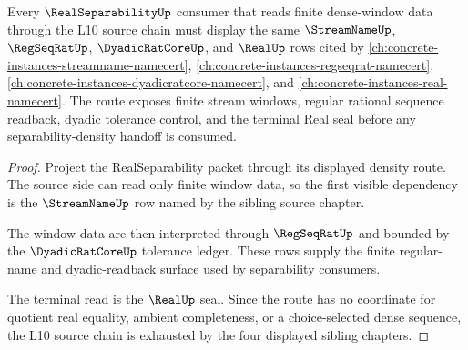 \begin{theorem}
\label{thm:real-separability-l10-source-route}
Every $\RealSeparabilityUp$ consumer that reads finite dense-window data through the L10 source chain must display the same $\StreamNameUp$, $\RegSeqRatUp$, $\DyadicRatCoreUp$, and $\RealUp$ rows cited by \autoref{ch:concrete-instances-streamname-namecert}, \autoref{ch:concrete-instances-regseqrat-namecert}, \autoref{ch:concrete-instances-dyadicratcore-namecert}, and \autoref{ch:concrete-instances-real-namecert}. The route exposes finite stream windows, regular rational sequence readback, dyadic tolerance control, and the terminal Real seal before any separability-density handoff is consumed.
\end{theorem}

\begin{proof}
Project the RealSeparability packet through its displayed density route. The source side can read only finite window data, so the first visible dependency is the $\StreamNameUp$ row named by the sibling source chapter.

The window data are then interpreted through $\RegSeqRatUp$ and bounded by the $\DyadicRatCoreUp$ tolerance ledger. These rows supply the finite regular-name and dyadic-readback surface used by separability consumers.

The terminal read is the $\RealUp$ seal. Since the route has no coordinate for quotient real equality, ambient completeness, or a choice-selected dense sequence, the L10 source chain is exhausted by the four displayed sibling chapters.
\end{proof}

